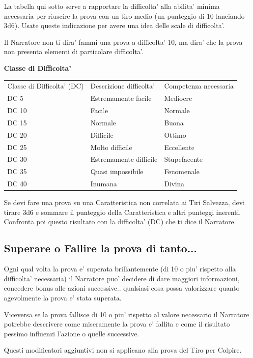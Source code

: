 \documentclass[a4paper,11pt,twoside,openany]{book}
\begin{document}
\bigskip

La tabella qui sotto serve a rapportare la difficolta' alla abilita' minima necessaria per riuscire la prova con un tiro medio (un punteggio di 10 lanciando 3d6). Usate queste indicazione per avere una idea delle scale di difficolta'.

Il Narratore non ti dira' fammi una prova a difficolta' 10, ma dira' che la prova non presenta elementi di particolare difficolta'.

\bigskip

\textbf{Classe di Difficolta'}
\medskip

\begin{tabular}{lll}
\toprule
Classe di Difficolta' (DC) & Descrizione difficolta' & Competenza necessaria\tabularnewline
DC 5 & Estremamente facile & Mediocre\tabularnewline
DC 10 & Facile & Normale\tabularnewline
DC 15 & Normale & Buona\tabularnewline
DC 20 & Difficile & Ottimo\tabularnewline
DC 25 & Molto difficile & Eccellente\tabularnewline
DC 30 & Estremamente difficile & Stupefacente\tabularnewline
DC 35 & Quasi impossibile & Fenomenale\tabularnewline
DC 40 & Inumana & Divina\tabularnewline

\end{tabular}

\bigskip

Se devi fare una prova su una Caratteristica non correlata ai Tiri Salvezza, devi tirare 3d6 e sommare il punteggio della Caratteristica e altri punteggi inerenti. Confronta poi questo risultato con la difficolta' (DC) che ti dice il Narratore.

\subsection{Superare o Fallire la prova di tanto...}

Ogni qual volta la prova e' superata brillantemente (di 10 o piu' rispetto alla difficolta' necessaria) il Narratore puo' decidere di dare maggiori informazioni, concedere bonus alle azioni successive.. qualsiasi cosa possa valorizzare quanto agevolmente la prova e' stata superata.

Viceversa se la prova fallisce di 10 o piu' rispetto al valore necessario il Narratore potrebbe descrivere come miseramente la prova e' fallita e come il risultato pessimo influenzi l'azione o quelle successive.

Questi modificatori aggiuntivi non si applicano alla prova del Tiro per Colpire.
\end{document}
